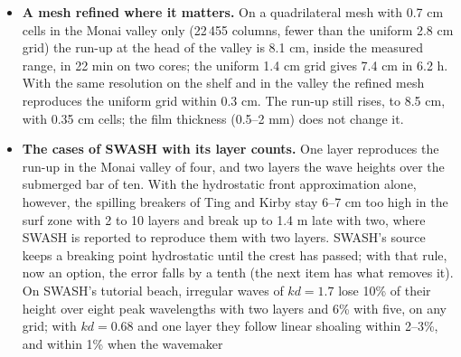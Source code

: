 \begin{itemize}[nosep]
        benchmark 7 the benchmark's incident wave drives the boundary
        wavemaker directly. On the same grid (2.8 cm) \NHFOAM\ and NHWAVE
        flood the same ground and run up 6.6 cm at the head of the valley,
        against 8.0--10.0 cm measured; on the benchmark grid (1.4 cm)
        \NHFOAM\ reaches 7.4 cm. Both follow the measured gauges to
        0.5--0.6 cm rms. The gauges stand in shallower water in the bed
        file than they did in the experiment and dry out in the models;
        NHWAVE's bore then arrives 0.3--0.4 s late, \NHFOAM's 0.03--0.39 s,
        and \NHFOAM's short crests are 13--29\% too high, with or without
        its breaking model. Neither \NHFOAM's breaking model nor NHWAVE's
        $k$--$\varepsilon$ model changes the run-up or the timing: the
        bores run over the dried bed at different speeds in the two
        models. A new option writes the free surface
        of every column at listed times, for shorelines without full field
        output.
  \item \textbf{A mesh refined where it matters.} On a quadrilateral mesh
        with 0.7 cm cells in the Monai valley only (22\,455 columns, fewer
        than the uniform 2.8 cm grid) the run-up at the head of the valley
        is 8.1 cm, inside the measured range, in 22 min on two cores; the
        uniform 1.4 cm grid gives 7.4 cm in 6.2 h. With the same
        resolution on the shelf and in the valley the refined mesh
        reproduces the uniform grid within 0.3 cm. The run-up still rises,
        to 8.5 cm, with 0.35 cm cells; the film thickness (0.5--2 mm) does
        not change it.
  \item \textbf{The cases of SWASH with its layer counts.} One layer
        reproduces the run-up in the Monai valley of four, and two layers
        the wave heights over the submerged bar of ten. With the
        hydrostatic front approximation alone, however, the spilling
        breakers of Ting and Kirby stay 6--7 cm too high in the surf zone
        with 2 to 10 layers and break up to 1.4 m late with two, where
        SWASH is reported to reproduce them with two layers. SWASH's
        source keeps a breaking point hydrostatic until the crest has
        passed; with that rule, now an option, the error falls by a tenth
        (the next item has what removes it). On
        SWASH's tutorial beach, irregular waves of $kd = 1.7$ lose 10\% of
        their height over eight peak wavelengths with two layers and 6\%
        with five, on any grid; with $kd = 0.68$ and one layer they follow
        linear shoaling within 2--3\%, and within 1\% when the wavemaker

\end{itemize}
